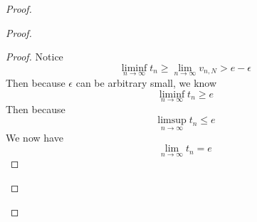 \documentclass{report}
\begin{document}
\begin{proof}
\begin{proof}
\begin{proof}
Notice 
\begin{equation}
\liminf_{n\to\infty} t_n\geq \lim_{n\to\infty}v_{n,N}>e-\epsilon 
\end{equation}
Then because $\epsilon $ can be arbitrary small, we know 
\begin{equation}
\liminf_{n\to\infty} t_n\geq e
\end{equation}
Then because 
\begin{equation}
\limsup_{n\to\infty} t_n\leq e
\end{equation}
We now have
\begin{equation}
\lim_{n\to\infty} t_n=e
\end{equation}

\end{proof}




\end{proof}
\end{proof}
\end{document}
